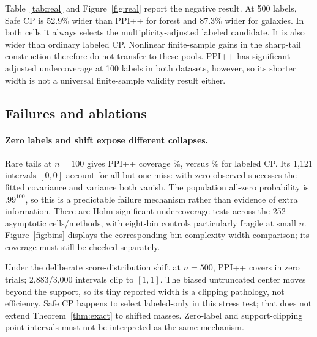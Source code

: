 \documentclass{article}
\begin{document}
Table~\ref{tab:real} and Figure~\ref{fig:real} report the negative result. At 500 labels, Safe CP is 52.9\% wider than PPI++ for forest and 87.3\% wider for galaxies. In both cells it always selects the multiplicity-adjusted labeled candidate. It is also wider than ordinary labeled CP. Nonlinear finite-sample gains in the sharp-tail construction therefore do not transfer to these pools. PPI++ has significant adjusted undercoverage at 100 labels in both datasets, however, so its shorter width is not a universal finite-sample validity result either.

\begin{table}[t]
\centering\small
\caption{Fixed real-prediction empirical populations: mean width / coverage percent. All cells have 3,000 repetitions, $N=20n$. Repeated source records at large $n,N$ reflect empirical-population sampling, not additional collected data.}\label{tab:real}

\end{table}

\subsection{Failures and ablations}
\paragraph{Zero labels and shift expose different collapses.}
Rare tails at $n=100$ gives PPI++ coverage \RarePPCov{}\%, versus \RareLabelCov{}\% for labeled CP. Its 1,121 intervals $[0,0]$ account for all but one miss: with zero observed successes the fitted covariance and variance both vanish. The population all-zero probability is $.99^{100}$, so this is a predictable failure mechanism rather than evidence of extra information. There are \NumUndercoverage{} Holm-significant undercoverage tests across the 252 asymptotic cells/methods, with eight-bin controls particularly fragile at small $n$. Figure~\ref{fig:bins} displays the corresponding bin-complexity width comparison; its coverage must still be checked separately.

Under the deliberate score-distribution shift at $n=500$, PPI++ covers in zero trials; 2,883/3,000 intervals clip to $[1,1]$. The biased untruncated center moves beyond the support, so its tiny reported width is a clipping pathology, not efficiency. Safe CP happens to select labeled-only in this stress test; that does not extend Theorem~\ref{thm:exact} to shifted masses. Zero-label and support-clipping point intervals must not be interpreted as the same mechanism.
\end{document}
